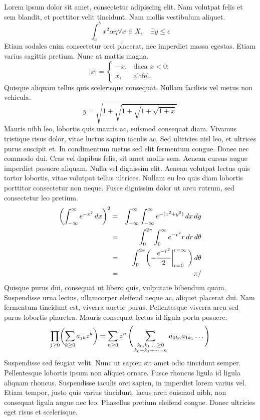 Lorem ipsum dolor sit amet, consectetur adipiscing elit. Nam volutpat felis et sem blandit, et porttitor velit tincidunt. Nam mollis vestibulum aliquet. 
\begin{equation}
\int_a^b x^2 \alpha \eta \forall x \in X, \quad \exists y \leq \epsilon
\end{equation}
Etiam sodales enim consectetur orci placerat, nec imperdiet massa egestas. Etiam varius sagittis pretium. Nunc at mattis magna.
$$|x| = \left\{\begin{array}{rl} -x, & \textrm{daca $x<0$;}\\ x, & \textrm{altfel.} \end{array} \right. $$
Quisque aliquam tellus quis scelerisque consequat. Nullam facilisis vel metus non vehicula.
$$y = \sqrt{1+\sqrt{1+\sqrt{1+ \sqrt{1+x}}}}$$
Mauris nibh leo, lobortis quis mauris ac, euismod consequat diam. Vivamus tristique risus dolor, vitae luctus sapien iaculis ac. Sed ultricies nisl leo, et ultrices purus suscipit et. In condimentum metus sed elit fermentum congue. Donec nec commodo dui. Cras vel dapibus felis, sit amet mollis sem. Aenean cursus augue imperdiet posuere aliquam. 
Nulla vel dignissim elit. Aenean volutpat lectus quis tortor lobortis, vitae volutpat tellus ultrices. Nullam eu leo quis diam lobortis porttitor consectetur non neque. Fusce dignissim dolor ut arcu rutrum, sed consectetur leo pretium.
\begin{eqnarray}
\biggl(\int_{-\infty} ^\infty e^{-x^2}\,dx\biggr)^2 & =& \int_{-\infty}^\infty \int_{-\infty}^\infty e^{-(x^2+y^2)}\,dx\,dy \nonumber \\ & =& \int_0^{2\pi}\int_0^\infty e^{-r^2}r\,dr\,d\theta \nonumber \\ & =& \int_0^{2\pi}\biggl(-{e^{-r^2}\over2} \bigg|_{r=0}^{r=\infty}\,\biggr)\,d\theta \nonumber \\ & =& \pi /\end{eqnarray}
 Quisque purus dui, consequat ut libero quis, vulputate bibendum quam. Suspendisse urna lectus, ullamcorper eleifend neque ac, aliquet placerat dui. Nam fermentum tincidunt est, viverra auctor purus. Pellentesque viverra arcu sed purus lobortis pharetra. Mauris consequat lectus id ligula porta posuere.
$$ \prod_{j\ge0}\biggl( \sum_{k\ge0}a_{jk}z^k\biggr) =\sum_{n\ge0}z^n\,\Biggl(\sum_ {\scriptstyle k_0,k_1, \ldots\ge0\atop \scriptstyle k_0+k_1+\cdots=n} a_{0k_0}a_{1k_1}\ldots\,\Biggr) $$
Suspendisse sed feugiat velit. Nunc ut sapien sit amet odio tincidunt semper. Pellentesque lobortis ipsum non aliquet ornare. Fusce rhoncus ligula id ligula aliquam rhoncus. Suspendisse iaculis orci sapien, in imperdiet lorem varius vel. Etiam tempor, justo quis varius tincidunt, lacus arcu euismod nibh, non consequat ligula augue nec leo. Phasellus pretium eleifend congue. Donec ultricies eget risus et scelerisque.
